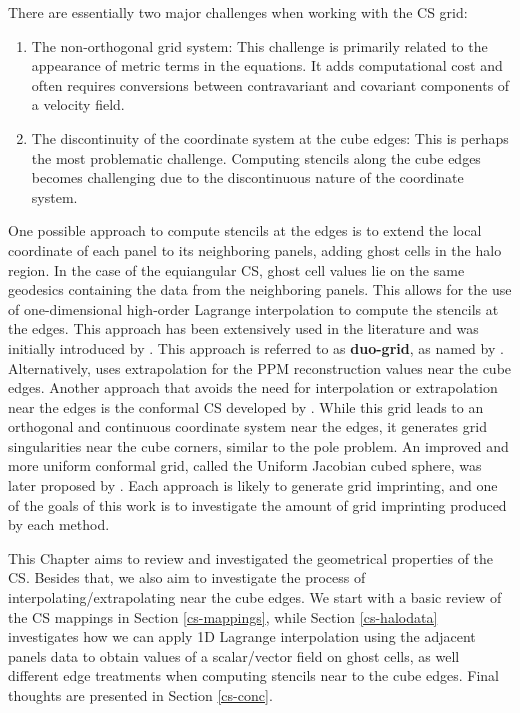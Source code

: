 There are essentially two major challenges when working with the CS grid:
\begin{enumerate}
\item
The non-orthogonal grid system: This challenge is primarily related to the appearance of
metric terms in the equations. It adds computational cost and often requires conversions
between contravariant and covariant components of a velocity field.
\item
The discontinuity of the coordinate system at the cube edges: This is perhaps the most 
problematic challenge. Computing stencils along the cube edges becomes challenging due to 
the discontinuous nature of the coordinate system.
\end{enumerate}
One possible approach to compute stencils at the edges is to extend the local coordinate 
of each panel to its neighboring panels, adding ghost cells in the halo region. In the 
case of the equiangular CS, ghost cell values lie on the same geodesics 
containing the data from the neighboring panels. This allows for the use of one-dimensional
high-order Lagrange interpolation to compute the stencils at the edges. 
This approach has been extensively used in the literature \citep{croisille:2013, 
katta:2015, katta:2015b, chen:2021} and was initially introduced by \citet{ronchi:1996}.
This approach is referred to as \textbf{duo-grid}, as named by \citet{chen:2021}.
Alternatively, \citet{putman:2007} uses extrapolation for the PPM reconstruction values near the cube edges.
Another approach that avoids the need for interpolation or extrapolation near the edges is 
the conformal CS developed by \citet{rancic:1996}. While this grid leads to an 
orthogonal and continuous coordinate system near the edges, it generates grid singularities
near the cube corners, similar to the pole problem. 
An improved and more uniform conformal grid, called the Uniform Jacobian cubed sphere, was 
later proposed by \citet{rancic:2017}.
Each approach is likely to generate grid imprinting, and one of the goals of this work is 
to investigate the amount of grid imprinting produced by each method.

This Chapter aims to review and investigated the geometrical properties
of the CS. Besides that, we also aim to investigate the process
of interpolating/extrapolating near the cube edges.
We start with a basic review of the CS mappings in Section \ref{cs-mappings},
while Section \ref{cs-halodata} investigates how we can apply 1D Lagrange interpolation using the adjacent panels
data to obtain values of a scalar/vector field on ghost cells, as well different edge
treatments when computing stencils near to the cube edges.
Final thoughts are presented in Section \ref{cs-conc}.


